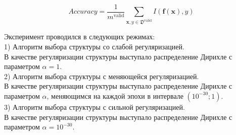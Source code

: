 \documentclass[12pt,twoside]{article}
\begin{document}
$$Accuracy = \frac{1}{m^\text{valid}}\sum_{\mathbf{x}, y \in \mathfrak{D}^\text{valid}} I(\mathbf{f}(\mathbf{x}), y)$$
 
 Эксперимент проводился в следующих режимах:\\
 
1) Алгоритм выбора структуры со слабой регуляризацией.\\
 В качестве регуляризации структуры выступало распределение Дирихле с параметром $\alpha = 1$.\\

2) Алгоритм выбора структуры с меняющейся регуляризацией.\\
В качестве регуляризации структуры выступало распределение Дирихле с параметром $\alpha$, меняющимся на каждой эпохи в интервале $(10^{-30}; 1)$.\\

3) Алгоритм выбора структуры с сильной регуляризацией. \\
В качестве регуляризации структуры выступало распределение Дирихле с параметром  $\alpha= 10^{-30}$.\\
 
\end{document}
